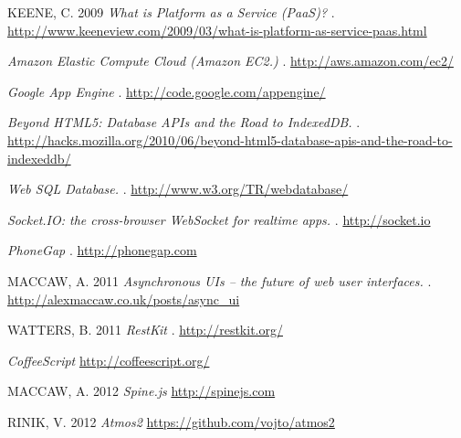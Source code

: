 \begin{thebibliography}{999}

KEENE, C. 2009 \emph{What is Platform as a Service (PaaS)?}
  .
\url{http://www.keeneview.com/2009/03/what-is-platform-as-service-paas.html}

\emph{Amazon Elastic Compute Cloud (Amazon EC2.)}
  .
\url{http://aws.amazon.com/ec2/}

\emph{Google App Engine}
  .
\url{http://code.google.com/appengine/ }

\emph{Beyond HTML5: Database APIs and the Road to IndexedDB. }
  .
\url{http://hacks.mozilla.org/2010/06/beyond-html5-database-apis-and-the-road-to-indexeddb/}

\emph{Web SQL Database.}
  .
\url{http://www.w3.org/TR/webdatabase/ }

\emph{Socket.IO: the cross-browser WebSocket for realtime apps.}
  .
\url{http://socket.io}

\emph{PhoneGap}
  .
\url{http://phonegap.com}

MACCAW, A. 2011 \emph{Asynchronous UIs – the future of web user interfaces.}
  .
\url{http://alexmaccaw.co.uk/posts/async_ui}

WATTERS, B. 2011 \emph{RestKit}
  .
\url{http://restkit.org/ }

\emph{CoffeeScript}
\url{http://coffeescript.org/}

MACCAW, A. 2012 \emph{Spine.js}
\url{http://spinejs.com}

RINIK, V. 2012 \emph{Atmos2}
\url{https://github.com/vojto/atmos2}


\end{thebibliography}
